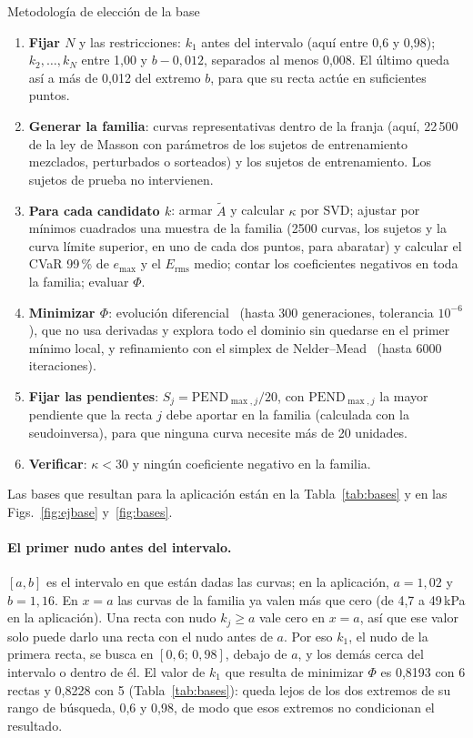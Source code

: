 \begin{caja}{Metodología de elección de la base}
\begin{enumerate}[label=\arabic*.]
\item \textbf{Fijar $N$} y las restricciones: $k_1$ antes del intervalo (aquí entre 0,6 y 0,98); $k_2,\ldots,k_N$ entre 1,00 y $b-0{,}012$, separados al menos 0,008. El último queda así a más de 0,012 del extremo $b$, para que su recta actúe en suficientes puntos.
\item \textbf{Generar la familia}: curvas representativas dentro de la franja (aquí, 22\,500 de la ley de Masson con parámetros de los sujetos de entrenamiento mezclados, perturbados o sorteados) y los sujetos de entrenamiento. Los sujetos de prueba no intervienen.
\item \textbf{Para cada candidato $k$}: armar $\tilde A$ y calcular $\kappa$ por SVD; ajustar por mínimos cuadrados una muestra de la familia (2500 curvas, los sujetos y la curva límite superior, en uno de cada dos puntos, para abaratar) y calcular el CVaR 99\,\% de $e_{\max}$ y el $E_{\mathrm{rms}}$ medio; contar los coeficientes negativos en toda la familia; evaluar $\Phi$.
\item \textbf{Minimizar $\Phi$}: evolución diferencial~\cite{storn} (hasta 300 generaciones, tolerancia $10^{-6}$), que no usa derivadas y explora todo el dominio sin quedarse en el primer mínimo local, y refinamiento con el simplex de Nelder--Mead~\cite{nelder} (hasta 6000 iteraciones).
\item \textbf{Fijar las pendientes}: $S_j=\mathrm{PEND}_{\max,j}/20$, con $\mathrm{PEND}_{\max,j}$ la mayor pendiente que la recta $j$ debe aportar en la familia (calculada con la seudoinversa), para que ninguna curva necesite más de 20 unidades.
\item \textbf{Verificar}: $\kappa<30$ y ningún coeficiente negativo en la familia.
\end{enumerate}
\end{caja}

Las bases que resultan para la aplicación están en la Tabla~\ref{tab:bases} y en las Figs.~\ref{fig:ejbase} y~\ref{fig:bases}.

\paragraph{El primer nudo antes del intervalo.} $[a,b]$ es el intervalo en que están dadas las curvas; en la aplicación, $a=1{,}02$ y $b=1{,}16$. En $x=a$ las curvas de la familia ya valen más que cero (de 4,7 a 49\,kPa en la aplicación). Una recta con nudo $k_j\ge a$ vale cero en $x=a$, así que ese valor solo puede darlo una recta con el nudo antes de $a$. Por eso $k_1$, el nudo de la primera recta, se busca en $[0{,}6;\,0{,}98]$, debajo de $a$, y los demás cerca del intervalo o dentro de él. El valor de $k_1$ que resulta de minimizar $\Phi$ es 0,8193 con 6 rectas y 0,8228 con 5 (Tabla~\ref{tab:bases}): queda lejos de los dos extremos de su rango de búsqueda, 0,6 y 0,98, de modo que esos extremos no condicionan el resultado.

